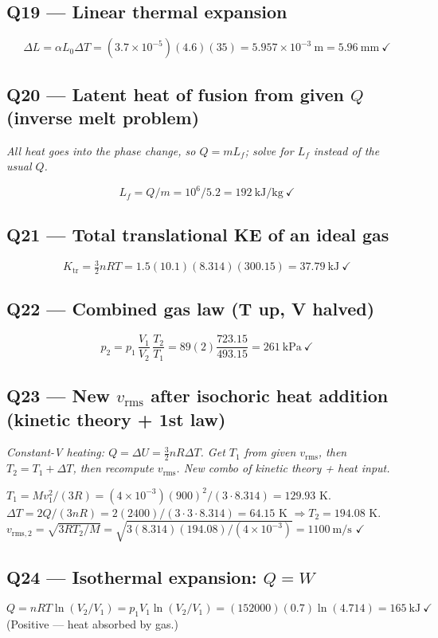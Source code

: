 \documentclass[11pt]{article}
\newcommand{\checkmk}{\ensuremath{\checkmark}}
\begin{document}
\subsection*{Q19 --- Linear thermal expansion}
\[\Delta L = \alpha L_0\Delta T = (3.7\times 10^{-5})(4.6)(35) = 5.957\times 10^{-3}\ \mathrm{m} = \boxed{5.96\ \mathrm{mm}}\ \checkmk\]

\subsection*{Q20 --- Latent heat of fusion from given \(Q\) (inverse melt problem)}
\emph{All heat goes into the phase change, so \(Q = mL_f\); solve for \(L_f\) instead of the usual \(Q\).}

\[L_f = Q/m = 10^6/5.2 = \boxed{192\ \mathrm{kJ/kg}}\ \checkmk\]

\subsection*{Q21 --- Total translational KE of an ideal gas}
\[K_{\mathrm{tr}} = \tfrac32 nRT = 1.5(10.1)(8.314)(300.15) = \boxed{37.79\ \mathrm{kJ}}\ \checkmk\]

\subsection*{Q22 --- Combined gas law (T up, V halved)}
\[p_2 = p_1\,\frac{V_1}{V_2}\,\frac{T_2}{T_1} = 89(2)\frac{723.15}{493.15} = \boxed{261\ \mathrm{kPa}}\ \checkmk\]

\subsection*{Q23 --- New \(v_{\mathrm{rms}}\) after isochoric heat addition (kinetic theory + 1st law)}
\emph{Constant-V heating: \(Q = \Delta U = \tfrac32 nR\Delta T\). Get \(T_1\) from given \(v_{\mathrm{rms}}\), then \(T_2 = T_1+\Delta T\), then recompute \(v_{\mathrm{rms}}\). New combo of kinetic theory + heat input.}

\(T_1 = Mv_1^2/(3R) = (4\times 10^{-3})(900)^2/(3\cdot 8.314) = 129.93\) K.\\
\(\Delta T = 2Q/(3nR) = 2(2400)/(3\cdot 3\cdot 8.314) = 64.15\) K \(\Rightarrow T_2 = 194.08\) K.\\
\(v_{\mathrm{rms},2} = \sqrt{3RT_2/M} = \sqrt{3(8.314)(194.08)/(4\times 10^{-3})} = \boxed{1100\ \mathrm{m/s}}\) \checkmk

\subsection*{Q24 --- Isothermal expansion: \(Q = W\)}
\[Q = nRT\ln(V_2/V_1) = p_1V_1\ln(V_2/V_1) = (152000)(0.7)\ln(4.714) = \boxed{165\ \mathrm{kJ}}\ \checkmk\]
(Positive --- heat absorbed by gas.)
\end{document}
